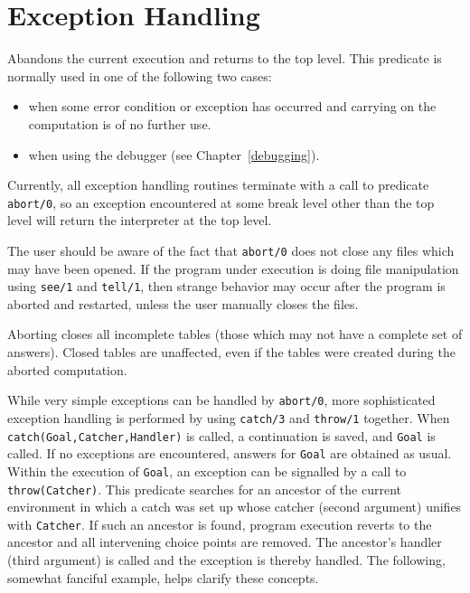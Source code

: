


\section{Exception Handling}\label{exception}

\begin{description}

    Abandons the current execution and returns to the top level.  This
    predicate is normally used in one of the following two cases: 
    \begin{itemize} 
    \item when some error condition or exception has occurred and carrying
	  on the computation is of no further use.
    \item when using the debugger (see Chapter~\ref{debugging}).  
    \end{itemize}
    Currently, all exception handling routines terminate with a call to 
    predicate {\tt abort/0}, so an exception encountered at some break level 
    other than the top level will return the interpreter at the top level.

    The user should be aware of the fact that {\tt abort/0} does not close 
    any files which may have been opened.  If the program under execution is 
    doing file manipulation using {\tt see/1} and {\tt tell/1}, then strange 
    behavior may occur after the program is aborted and restarted, unless
    the user manually closes the files.

    Aborting closes all incomplete tables (those which may not have a 
    complete set of answers).  Closed tables are unaffected, even if 
    the tables were created during the aborted computation.

\vspace{-7mm}
While very simple exceptions can be handled by {\tt abort/0}, more
sophisticated exception handling is performed by using {\tt catch/3}
and {\tt throw/1} together.  When {\tt catch(Goal,Catcher,Handler)} is
called, a continuation is saved, and {\tt Goal} is called.  If no
exceptions are encountered, answers for {\tt Goal} are obtained as
usual.  Within the execution of {\tt Goal}, an exception can be
signalled by a call to {\tt throw(Catcher)}.  This predicate searches
for an ancestor of the current environment in which a catch was set up
whose catcher (second argument) unifies with {\tt Catcher}.  If such
an ancestor is found, program execution reverts to the ancestor and
all intervening choice points are removed.  The ancestor's handler
(third argument) is called and the exception is thereby handled.  The
following, somewhat fanciful example, helps clarify these concepts.


\end{description}
